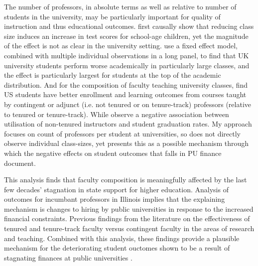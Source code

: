 \documentclass[notitlepage,12pt]{article}
\begin{document}
The number of professors, in absolute terms as well as relative to number of students in the university, may be particularly important for quality of instruction and thus educational outcomes.
\cite{angrist1999using} first causally show that reducing class size induces an increase in test scores for school-age children, yet the magnitude of the effect is not as clear in the university setting.
\cite{bandiera2010heterogeneous} use a fixed effect model, combined with multiple individual observations in a long panel, to find that UK university students perform worse academically in particularly large classes, and the effect is particularly largest for students at the top of the academic distribution.
And for the composition of faculty teaching university classes, 
\cite{bettinger2010does,figlio2015tenure} find US students have better enrollment and learning outcomes from courses taught by contingent or adjunct (i.e. not tenured or on tenure-track) professors (relative to tenured or tenure-track).
While \cite{ehrenberg2005tenured} observe a negative association between utilisation of non-tenured instructors and student graduation rates.
My approach focuses on count of professors per student at universities, so does not directly observe individual class-sizes, yet presents this as a possible mechanism through which the negative effects on student outcomes that falls in PU finance \cite{NBERw23736,NBERw27885} document.

This analysis finds that faculty composition is meaningfully affected by the last few decades' stagnation in state support for higher education.
Analysis of outcomes for incumbant professors in Illinois implies that the explaining mechanism is changes to hiring by public universities in response to the increased financial constraints.
Previous findings from the literature on the effectiveness of tenured and tenure-track faculty versus contingent faculty in the areas of research and teaching.
Combined with this analysis, these findings provide a plausible mechanism for the deteriorating student ouctomes shown to be a result of stagnating finances at public universities \citep{NBERw23736,NBERw27885}.

%        
%        
%        
\end{document}

